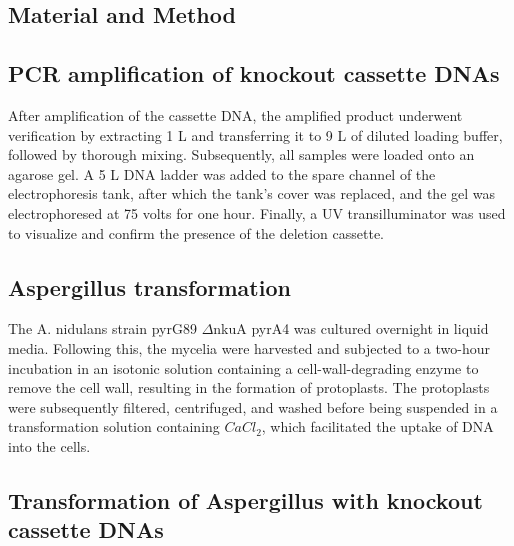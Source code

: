\documentclass[a4paper,10pt]{article}
\begin{document}
\begin{multicols}{2}
\section{Material and Method}





\subsection{PCR amplification of knockout cassette DNAs }
After amplification of the cassette DNA, the amplified product underwent verification by extracting 1 \textmu L and transferring it to 9 \textmu L of diluted loading buffer, followed by thorough mixing. Subsequently, all samples were loaded onto an agarose gel. A 5 \textmu L DNA ladder was added to the spare channel of the electrophoresis tank, after which the tank's cover was replaced, and the gel was electrophoresed at 75 volts for one hour. Finally, a UV transilluminator was used to visualize and confirm the presence of the deletion cassette.


\subsection{Aspergillus transformation}
The A. nidulans strain pyrG89 $\Delta$nkuA pyrA4 was cultured overnight in liquid media. Following this, the mycelia were harvested and subjected to a two-hour incubation in an isotonic solution containing a cell-wall-degrading enzyme to remove the cell wall, resulting in the formation of protoplasts. The protoplasts were subsequently filtered, centrifuged, and washed before being suspended in a transformation solution containing $CaCl_2$, which facilitated the uptake of DNA into the cells.


\subsection{Transformation of Aspergillus with knockout cassette DNAs}


\end{multicols}
\end{document}
